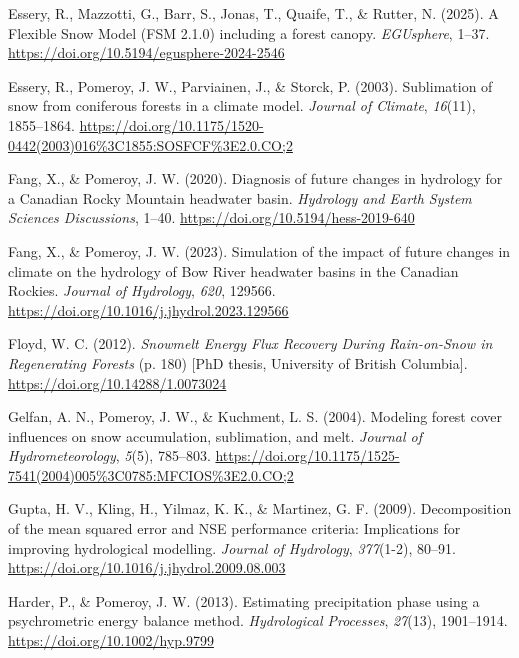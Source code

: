\documentclass[
]{agujournal2019}
\newlength{\cslhangindent}
\newenvironment{CSLReferences}[2] %
 {\begin{list}{}{%
  \setlength{\itemindent}{0pt}
  \setlength{\leftmargin}{0pt}
  \setlength{\parsep}{0pt}
  \ifodd #1
   \setlength{\leftmargin}{\cslhangindent}
   \setlength{\itemindent}{-1\cslhangindent}
  \fi
  \setlength{\itemsep}{#2\baselineskip}}}
 {\end{list}}
\begin{document}
\begin{CSLReferences}{1}{0}
Essery, R., Mazzotti, G., Barr, S., Jonas, T., Quaife, T., \& Rutter, N.
(2025). A {Flexible Snow Model} ({FSM} 2.1.0) including a forest canopy.
\emph{EGUsphere}, 1--37.
\url{https://doi.org/10.5194/egusphere-2024-2546}

Essery, R., Pomeroy, J. W., Parviainen, J., \& Storck, P. (2003).
Sublimation of snow from coniferous forests in a climate model.
\emph{Journal of Climate}, \emph{16}(11), 1855--1864.
\url{https://doi.org/10.1175/1520-0442(2003)016\%3C1855:SOSFCF\%3E2.0.CO;2}

Fang, X., \& Pomeroy, J. W. (2020). Diagnosis of future changes in
hydrology for a {Canadian Rocky Mountain} headwater basin.
\emph{Hydrology and Earth System Sciences Discussions}, 1--40.
\url{https://doi.org/10.5194/hess-2019-640}

Fang, X., \& Pomeroy, J. W. (2023). Simulation of the impact of future
changes in climate on the hydrology of {Bow River} headwater basins in
the {Canadian Rockies}. \emph{Journal of Hydrology}, \emph{620}, 129566.
\url{https://doi.org/10.1016/j.jhydrol.2023.129566}

Floyd, W. C. (2012). \emph{Snowmelt {Energy Flux Recovery During
Rain-on-Snow} in {Regenerating Forests}} (p. 180) {[}PhD thesis,
University of British Columbia{]}.
\url{https://doi.org/10.14288/1.0073024}

Gelfan, A. N., Pomeroy, J. W., \& Kuchment, L. S. (2004). Modeling
forest cover influences on snow accumulation, sublimation, and melt.
\emph{Journal of Hydrometeorology}, \emph{5}(5), 785--803.
\url{https://doi.org/10.1175/1525-7541(2004)005\%3C0785:MFCIOS\%3E2.0.CO;2}

Gupta, H. V., Kling, H., Yilmaz, K. K., \& Martinez, G. F. (2009).
Decomposition of the mean squared error and {NSE} performance criteria:
{Implications} for improving hydrological modelling. \emph{Journal of
Hydrology}, \emph{377}(1-2), 80--91.
\url{https://doi.org/10.1016/j.jhydrol.2009.08.003}

Harder, P., \& Pomeroy, J. W. (2013). Estimating precipitation phase
using a psychrometric energy balance method. \emph{Hydrological
Processes}, \emph{27}(13), 1901--1914.
\url{https://doi.org/10.1002/hyp.9799}


\end{CSLReferences}
\end{document}
